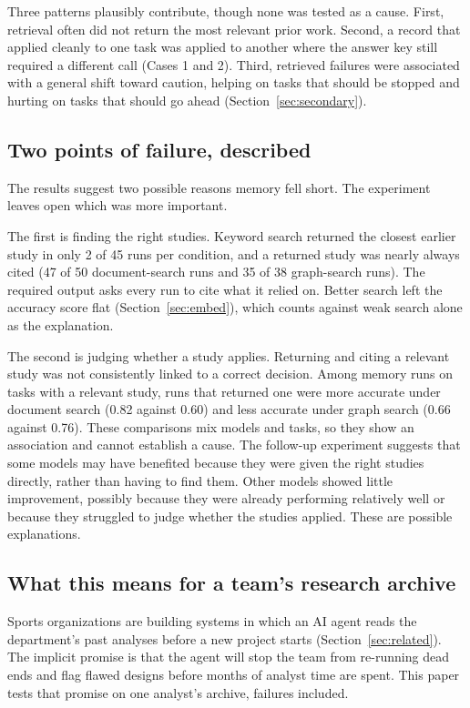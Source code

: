 \documentclass[11pt]{article}
\begin{document}
Three patterns plausibly contribute, though none was tested as a cause. First, retrieval often did not return the most relevant prior work. Second, a record that applied cleanly to one task was applied to another where the answer key still required a different call (Cases 1 and 2). Third, retrieved failures were associated with a general shift toward caution, helping on tasks that should be stopped and hurting on tasks that should go ahead (Section~\ref{sec:secondary}).

\subsection{Two points of failure, described}

The results suggest two possible reasons memory fell short. The experiment leaves open which was more important.

The first is finding the right studies. Keyword search returned the closest earlier study in only 2 of 45 runs per condition, and a returned study was nearly always cited (47 of 50 document-search runs and 35 of 38 graph-search runs). The required output asks every run to cite what it relied on. Better search left the accuracy score flat (Section~\ref{sec:embed}), which counts against weak search alone as the explanation.

The second is judging whether a study applies. Returning and citing a relevant study was not consistently linked to a correct decision. Among memory runs on tasks with a relevant study, runs that returned one were more accurate under document search (0.82 against 0.60) and less accurate under graph search (0.66 against 0.76). These comparisons mix models and tasks, so they show an association and cannot establish a cause. The follow-up experiment suggests that some models may have benefited because they were given the right studies directly, rather than having to find them. Other models showed little improvement, possibly because they were already performing relatively well or because they struggled to judge whether the studies applied. These are possible explanations.

\subsection{What this means for a team's research archive}

Sports organizations are building systems in which an AI agent reads the department's past analyses before a new project starts (Section~\ref{sec:related}). The implicit promise is that the agent will stop the team from re-running dead ends and flag flawed designs before months of analyst time are spent. This paper tests that promise on one analyst's archive, failures included.
\end{document}
